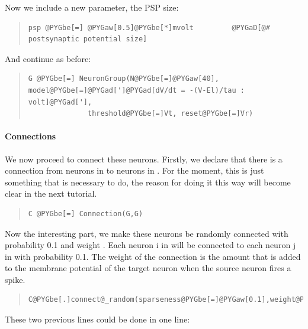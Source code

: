 \documentclass[letterpaper,10pt,english]{manual}
\begin{document}
Now we include a new parameter, the PSP size:
\begin{quote}

\begin{Verbatim}[commandchars=@\[\]]
psp @PYGbe[=] @PYGaw[0.5]@PYGbe[*]mvolt         @PYGaD[@# postsynaptic potential size]
\end{Verbatim}
\end{quote}

And continue as before:
\begin{quote}

\begin{Verbatim}[commandchars=@\[\]]
G @PYGbe[=] NeuronGroup(N@PYGbe[=]@PYGaw[40], model@PYGbe[=]@PYGad[']@PYGad[dV/dt = -(V-El)/tau : volt]@PYGad['],
              threshold@PYGbe[=]Vt, reset@PYGbe[=]Vr)
\end{Verbatim}
\end{quote}


\paragraph{Connections}

We now proceed to connect these neurons. Firstly, we declare
that there is a connection from neurons in  to neurons in .
For the moment, this is just something that is necessary to
do, the reason for doing it this way will become clear in the
next tutorial.
\begin{quote}

\begin{Verbatim}[commandchars=@\[\]]
C @PYGbe[=] Connection(G,G)
\end{Verbatim}
\end{quote}

Now the interesting part, we make these neurons be randomly
connected with probability 0.1 and weight . Each neuron
i in  will be connected to each neuron j in 
with probability 0.1. The weight of the connection is the
amount that is added to the membrane potential of the target
neuron when the source neuron fires a spike.
\begin{quote}

\begin{Verbatim}[commandchars=@\[\]]
C@PYGbe[.]connect@_random(sparseness@PYGbe[=]@PYGaw[0.1],weight@PYGbe[=]psp)
\end{Verbatim}
\end{quote}

These two previous lines could be done in one line:
\end{document}
